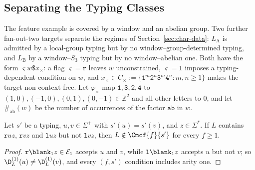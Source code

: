 \subsection{Separating the Typing Classes}
\label{subsec:necessity}

The feature example is covered by a window and an abelian group.  Two further
fan-out-two targets separate the regimes of Section~\ref{sec:char-data}: $L_{\mathrm A}$
is admitted by a local-group typing but by no window--group-determined typing, and
$L_{\mathrm B}$ by a window--$S_3$ typing but by no window--abelian one.  Both have
the form $\varsigma w\mathtt\$x_\times$: a flag $\varsigma=\mathtt r$ leaves $w$ unconstrained,
$\varsigma=\mathtt l$ imposes a typing-dependent condition on $w$, and
$x_\times\in C_\times:=\{\mathtt{1}^m\mathtt{2}^n\mathtt{3}^m\mathtt{4}^n:m,n\ge1\}$ makes the
target non-context-free.  Let $\varphi_\times$ map
$\mathtt 1,\mathtt 3,\mathtt 2,\mathtt 4$ to $(1,0),(-1,0),(0,1),(0,-1)\in\mathbb Z^2$
and all other letters to $0$, and let $\#_{\mathtt{ab}}(w)$ be the number of
occurrences of the factor $\mathtt{ab}$ in $w$.

\begin{lemma}
\label{lem:flag-separation}
Let $s'$ be a typing, $u,v\in\Sigma^+$ with $s'(u)=s'(v)$, and $z\in\Sigma^*$.  If $L$
contains $\mathtt ruz$, $\mathtt rvz$ and $\mathtt luz$ but not $\mathtt lvz$, then
$L\notin\Cmcf{f}{s'}$ for every $f\ge1$.
\end{lemma}

\begin{proof}
$\mathtt r\blank_1z\in\mathcal E_1$ accepts $u$ and $v$, while $\mathtt l\blank_1z$
accepts $u$ but not $v$; so $\D^{(1)}_L(u)\ne\D^{(1)}_L(v)$, and every $(f,s')$
condition includes arity one.
\end{proof}

